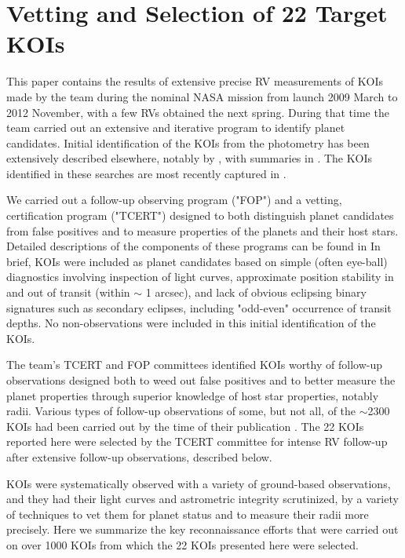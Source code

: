 \documentclass{emulateapj}
\begin{document}

\section{Vetting and Selection of 22 Target KOIs}
\label{sec:vetting}

This paper contains the results of extensive precise RV measurements
of KOIs made by the \ek team during the nominal NASA mission from
launch 2009 March to 2012 November, with a few RVs obtained the next
spring.  During that time the \ek team carried out an extensive and
iterative program to identify planet candidates.  Initial
identification of the KOIs from the photometry has been extensively
described elsewhere, notably by \cite{Caldwell2010, Jenkins2010a,
Jenkins2010b,
  VanCleve2009, Argabright2008}, with summaries in
\cite{Borucki2010}.  The KOIs identified in these searches are most 
recently captured in \cite{Batalha2013}.

We carried out a follow-up observing program ("FOP") and a vetting,
certification program ("TCERT") designed to both distinguish planet
candidates from false positives and to measure properties of the
planets and their host stars.  Detailed descriptions of the components
of these programs can be found in \citep{Gautier2010, Borucki2011,
  Batalha2013} In brief, KOIs were included as planet candidates based
on simple (often eye-ball) diagnostics involving inspection of \ek
light curves, approximate position stability in and out of transit
(within $\sim$ 1 arcsec), and lack of obvious eclipsing binary
signatures such as secondary eclipses, including "odd-even" occurrence
of transit depths.  No non-\ek observations were included in this
initial identification of the KOIs.

The \ek team's TCERT and FOP committees identified KOIs worthy of
follow-up observations designed both to weed out false positives and
to better measure the planet properties through superior knowledge of
host star properties, notably radii.  Various types of follow-up
observations of some, but not all, of the $\sim$2300 KOIs had been
carried out by the time of their publication \citep{Borucki2011,
  Batalha2013}.  The 22 KOIs reported here were selected by the TCERT
committee for intense RV follow-up after extensive follow-up
observations, described below.

KOIs were systematically observed with a variety of ground-based
observations, and they had their \ek light curves and astrometric
integrity scrutinized, by a variety of techniques to vet them for
planet status and to measure their radii more precisely.  Here we
summarize the key reconnaissance efforts that were carried out on over
1000 KOIs from which the 22 KOIs presented here were selected.
\end{document}
